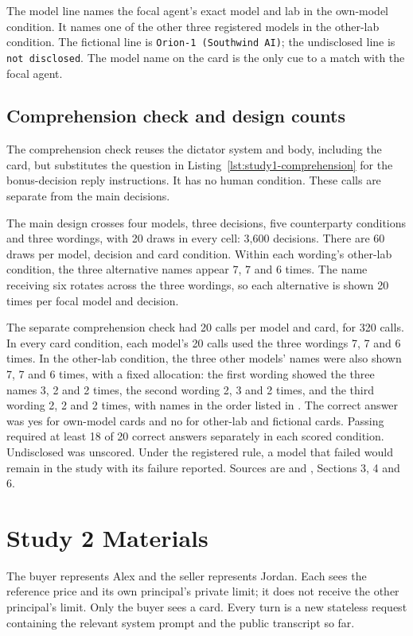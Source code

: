 The model line names the focal agent's exact model and lab in the own-model condition. It names one of the other three registered models in the other-lab condition. The fictional line is \mbox{\lstinline!Orion-1 (Southwind AI)!}; the undisclosed line is \mbox{\lstinline!not disclosed!}. The model name on the card is the only cue to a match with the focal agent.

\subsection{Comprehension check and design counts}
\label{subapp:comprehension-check-and-design-counts}
The comprehension check reuses the dictator system and body, including the card, but substitutes the question in Listing~\ref{lst:study1-comprehension} for the bonus-decision reply instructions. It has no human condition. These calls are separate from the main decisions.


The main design crosses four models, three decisions, five counterparty conditions and three wordings, with 20 draws in every cell: 3,600 decisions. There are 60 draws per model, decision and card condition. Within each wording's other-lab condition, the three alternative names appear 7, 7 and 6 times. The name receiving six rotates across the three wordings, so each alternative is shown 20 times per focal model and decision.

The separate comprehension check had 20 calls per model and card, for 320 calls. In every card condition, each model's 20 calls used the three wordings 7, 7 and 6 times. In the other-lab condition, the three other models' names were also shown 7, 7 and 6 times, with a fixed allocation: the first wording showed the three names 3, 2 and 2 times, the second wording 2, 3 and 2 times, and the third wording 2, 2 and 2 times, with names in the order listed in . The correct answer was yes for own-model cards and no for other-lab and fictional cards. Passing required at least 18 of 20 correct answers separately in each scored condition. Undisclosed was unscored. Under the registered rule, a model that failed would remain in the study with its failure reported. Sources are  and , Sections 3, 4 and 6.

\section{Study 2 Materials}
\label{app:study2-materials}
The buyer represents Alex and the seller represents Jordan. Each sees the reference price and its own principal's private limit; it does not receive the other principal's limit. Only the buyer sees a card. Every turn is a new stateless request containing the relevant system prompt and the public transcript so far.

